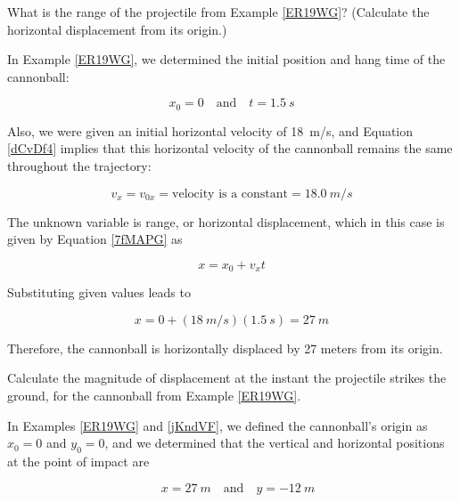 \documentclass[main-physics.tex]{subfiles}
\begin{document}
\begin{example} \label{jKndVF}
    What is the range of the projectile from Example \ref{ER19WG}? (Calculate the horizontal displacement from its origin.)
\end{example}

\Solution In Example \ref{ER19WG}, we determined the initial position and hang time of the cannonball:

\begin{equation*}
    x_0 = 0 \quad \text{and} \quad t = \SI{1.5}{s}
\end{equation*}

Also, we were given an initial horizontal velocity of \SI{18}{m/s}, and Equation \eqref{dCvDf4} implies that this horizontal velocity of the cannonball remains the same throughout the trajectory:

\begin{equation*}
    v_x = v_{0x} = \text{velocity is a constant} = \SI{18.0}{m/s}
\end{equation*}

The unknown variable is range, or horizontal displacement, which in this case is given by Equation \eqref{7fMAPG} as

\begin{equation*}
    x = x_0 + v_x t
\end{equation*}

Substituting given values leads to 

\begin{equation*}
    x = 0 + (\SI{18}{m/s})(\SI{1.5}{s}) = \SI{27}{m}
\end{equation*}

Therefore, the cannonball is horizontally displaced by 27 meters from its origin.

\endsolution

\begin{example}
    Calculate the magnitude of displacement at the instant the projectile strikes the ground, for the cannonball from Example \ref{ER19WG}.
\end{example}

\Solution In Examples \ref{ER19WG} and \ref{jKndVF}, we defined the cannonball's origin as $x_0 = 0$ and $y_0 = 0$, and we determined that the vertical and horizontal positions at the point of impact are

\begin{equation*}
    \quad x = \SI{27}{m} \quad \text{and} \quad y = \SI{-12}{m}
\end{equation*}
\end{document}
